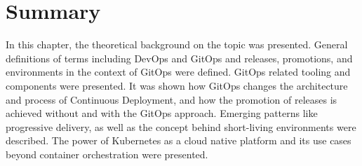 \section{Summary}

In this chapter,
the theoretical background on the topic was presented.
General definitions of terms including DevOps and GitOps and
releases, promotions, and environments in the context of GitOps were defined.
GitOps related tooling and components were presented.
It was shown how GitOps changes the architecture and process of Continuous Deployment,
and how the promotion of releases is achieved without and with the GitOps approach.
Emerging patterns like progressive delivery,
as well as the concept behind short-living environments were described.
The power of Kubernetes as a cloud native platform and its use cases beyond container orchestration were presented.































